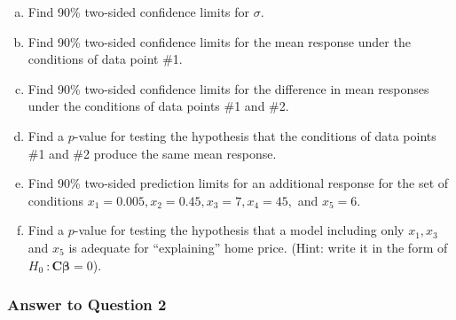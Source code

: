 \documentclass[paper=a4, fontsize=11pt]{scrartcl} %
\newcommand{\vecBeta}{\mathbf{\beta}}
\newcommand{\matC}{\mathbf{C}}
\begin{document}
\begin{enumerate}[(a)]

\item Find 90\% two-sided confidence limits for $\sigma$.\\

\item Find 90\% two-sided confidence limits for the mean response under the conditions of data point \#1.\\

\item Find 90\% two-sided confidence limits for the difference in mean responses under the conditions
of data points \#1 and \#2.\\

\item Find a $p$-value for testing the hypothesis that the conditions of data points \#1 and \#2 produce
the same mean response.\\

\item Find 90\% two-sided prediction limits for an additional response for the set of conditions
$x_1 = 0.005, x_2 = 0.45, x_3 =7, x_4 = 45,$ and $x_5 = 6.$\\

\item Find a $p$-value for testing the hypothesis that a model including only $ x_1, x_3$ and $x_5$ is 
adequate for ``explaining'' home price. (Hint: write it in the form of $ H_0 \ : \matC \vecBeta = 0$).\\
\end{enumerate}
\bigskip
\subsubsection*{Answer to Question 2}
\end{document}
